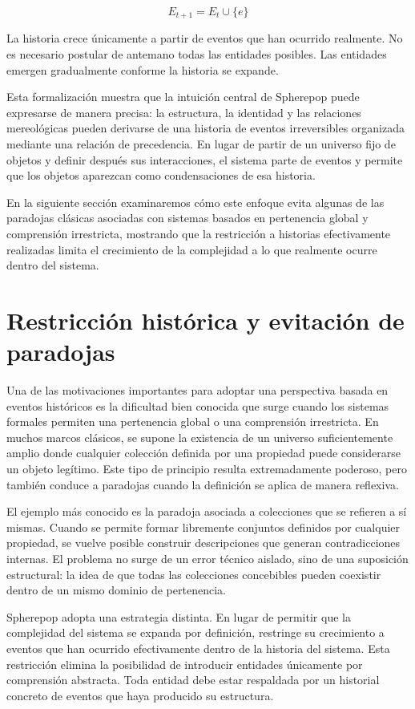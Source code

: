 \documentclass[12pt]{article}
\begin{document}
\[
E_{t+1} = E_t \cup \{e\}
\]

La historia crece únicamente a partir de eventos que han ocurrido realmente. No es necesario postular de antemano todas las entidades posibles. Las entidades emergen gradualmente conforme la historia se expande.

Esta formalización muestra que la intuición central de Spherepop puede expresarse de manera precisa: la estructura, la identidad y las relaciones mereológicas pueden derivarse de una historia de eventos irreversibles organizada mediante una relación de precedencia. En lugar de partir de un universo fijo de objetos y definir después sus interacciones, el sistema parte de eventos y permite que los objetos aparezcan como condensaciones de esa historia.

En la siguiente sección examinaremos cómo este enfoque evita algunas de las paradojas clásicas asociadas con sistemas basados en pertenencia global y comprensión irrestricta, mostrando que la restricción a historias efectivamente realizadas limita el crecimiento de la complejidad a lo que realmente ocurre dentro del sistema.

\section{Restricción histórica y evitación de paradojas}

Una de las motivaciones importantes para adoptar una perspectiva basada en eventos históricos es la dificultad bien conocida que surge cuando los sistemas formales permiten una pertenencia global o una comprensión irrestricta. En muchos marcos clásicos, se supone la existencia de un universo suficientemente amplio donde cualquier colección definida por una propiedad puede considerarse un objeto legítimo. Este tipo de principio resulta extremadamente poderoso, pero también conduce a paradojas cuando la definición se aplica de manera reflexiva.

El ejemplo más conocido es la paradoja asociada a colecciones que se refieren a sí mismas. Cuando se permite formar libremente conjuntos definidos por cualquier propiedad, se vuelve posible construir descripciones que generan contradicciones internas. El problema no surge de un error técnico aislado, sino de una suposición estructural: la idea de que todas las colecciones concebibles pueden coexistir dentro de un mismo dominio de pertenencia.

Spherepop adopta una estrategia distinta. En lugar de permitir que la complejidad del sistema se expanda por definición, restringe su crecimiento a eventos que han ocurrido efectivamente dentro de la historia del sistema. Esta restricción elimina la posibilidad de introducir entidades únicamente por comprensión abstracta. Toda entidad debe estar respaldada por un historial concreto de eventos que haya producido su estructura.
\end{document}
